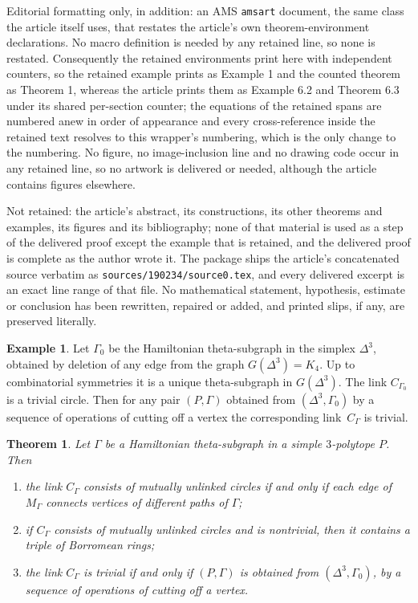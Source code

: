 \documentclass[10pt,a4paper]{amsart}
\theoremstyle{plain}
\newtheorem{theorem}{Theorem}
\theoremstyle{definition}
\newtheorem{example}{Example}
\theoremstyle{remark}
\begin{document}
Editorial formatting only, in addition: an AMS \texttt{amsart} document, the same class the article itself uses, that restates the article's own theorem-environment declarations. No macro definition is needed by any retained line, so none is restated. Consequently the retained environments print here with independent counters, so the retained example prints as Example 1 and the counted theorem as Theorem 1, whereas the article prints them as Example 6.2 and Theorem 6.3 under its shared per-section counter; the equations of the retained spans are numbered anew in order of appearance and every cross-reference inside the retained text resolves to this wrapper's numbering, which is the only change to the numbering. No figure, no image-inclusion line and no drawing code occur in any retained line, so no artwork is delivered or needed, although the article contains figures elsewhere.

Not retained: the article's abstract, its constructions, its other theorems and examples, its figures and its bibliography; none of that material is used as a step of the delivered proof except the example that is retained, and the delivered proof is complete as the author wrote it. The package ships the article's concatenated source verbatim as \texttt{sources/190234/source0.tex}, and every delivered excerpt is an exact line range of that file. No mathematical statement, hypothesis, estimate or conclusion has been rewritten, repaired or added, and printed slips, if any, are preserved literally.
\begin{example}\label{ex:D30}
Let $\Gamma_0$ be the Hamiltonian theta-subgraph in the simplex $\Delta^3$, obtained by deletion of any edge 
from the graph $G(\Delta^3)=K_4$. Up to combinatorial symmetries it is a unique theta-subgraph in $G(\Delta^3)$.
The link $C_{\Gamma_0}$ is a trivial circle. Then for any pair $(P,\Gamma)$ obtained
from  $(\Delta^3,\Gamma_0)$ by a sequence of operations of cutting off a vertex the corresponding link~$C_{\Gamma}$
is trivial.
\end{example}

\begin{theorem}\label{Th:unl}
Let $\Gamma$ be a Hamiltonian theta-subgraph in a simple $3$-polytope $P$. Then 
\begin{enumerate}
\item the link $C_\Gamma$ consists of mutually unlinked circles if and only if each edge of $M_{\Gamma}$
connects vertices of different paths of $\Gamma$;
\item if $C_\Gamma$ consists of mutually unlinked circles and is nontrivial, then it contains 
a triple of Borromean rings; 
\item the link $C_\Gamma$ is trivial if and only if  $(P,\Gamma)$ is obtained from $(\Delta^3,\Gamma_0)$,
by a sequence of operations of cutting off a vertex.
\end{enumerate}
\end{theorem}
\end{document}
